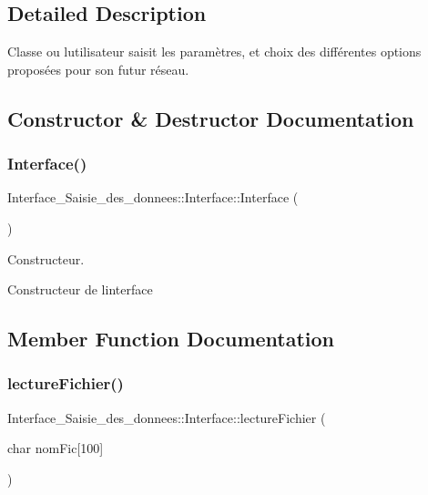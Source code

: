 \subsection{Detailed Description}
Classe ou l\textquotesingle{}utilisateur saisit les paramètres, et choix des différentes options proposées pour son futur réseau. 

\subsection{Constructor \& Destructor Documentation}
\mbox{\label{class_interface___saisie__des__donnees_1_1_interface_a72c791f0d80f2f93845f61ad679f11ec}} 
\subsubsection{\texorpdfstring{Interface()}{Interface()}}
{\footnotesize\ttfamily Interface\+\_\+\+Saisie\+\_\+des\+\_\+donnees\+::\+Interface\+::\+Interface (\begin{DoxyParamCaption}{ }\end{DoxyParamCaption})}



Constructeur. 

Constructeur de l\textquotesingle{}interface 

\subsection{Member Function Documentation}
\mbox{\label{class_interface___saisie__des__donnees_1_1_interface_a5cd79d6131ec57d8e32f74772ee553b2}} 
\subsubsection{\texorpdfstring{lecture\+Fichier()}{lectureFichier()}}
{\footnotesize\ttfamily Interface\+\_\+\+Saisie\+\_\+des\+\_\+donnees\+::\+Interface\+::lecture\+Fichier (\begin{DoxyParamCaption}\item[{char}]{nom\+Fic\mbox{[}100\mbox{]} }\end{DoxyParamCaption})}



